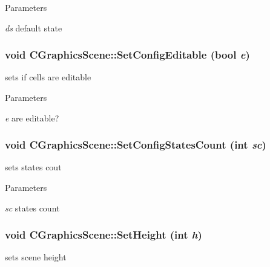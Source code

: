 \begin{DoxyParams}{Parameters}
\item[{\em ds}]default state \end{DoxyParams}
\hypertarget{classCGraphicsScene_a371dfa6cc547d24db00756048fe065b9}{
\subsubsection[{SetConfigEditable}]{\setlength{\rightskip}{0pt plus 5cm}void CGraphicsScene::SetConfigEditable (bool {\em e})}}
\label{classCGraphicsScene_a371dfa6cc547d24db00756048fe065b9}
sets if cells are editable


\begin{DoxyParams}{Parameters}
\item[{\em e}]are editable? \end{DoxyParams}
\hypertarget{classCGraphicsScene_a22e3319fb3557f244c7a8c6eca0bfb06}{
\subsubsection[{SetConfigStatesCount}]{\setlength{\rightskip}{0pt plus 5cm}void CGraphicsScene::SetConfigStatesCount (int {\em sc})}}
\label{classCGraphicsScene_a22e3319fb3557f244c7a8c6eca0bfb06}
sets states cout


\begin{DoxyParams}{Parameters}
\item[{\em sc}]states count \end{DoxyParams}
\hypertarget{classCGraphicsScene_ac8674f95fe4430eca696633f674ce965}{
\subsubsection[{SetHeight}]{\setlength{\rightskip}{0pt plus 5cm}void CGraphicsScene::SetHeight (int {\em h})}}
\label{classCGraphicsScene_ac8674f95fe4430eca696633f674ce965}
sets scene height


